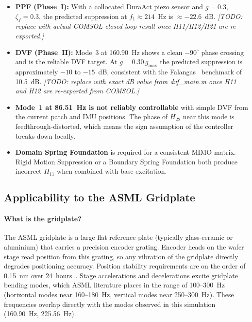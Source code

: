 \documentclass[12pt,a4paper]{article}
\begin{document}
\begin{itemize}
  \item \textbf{PPF (Phase~I):} With a collocated DuraAct piezo sensor and $g = 0.3$,
        $\zeta_f = 0.3$, the predicted suppression at $f_1 \approx 214$~Hz is
        $\approx -22.6$~dB.
        \emph{[TODO: replace with actual COMSOL closed-loop result once H11/H12/H21
        are re-exported.]}

  \item \textbf{DVF (Phase~II):} Mode~3 at 160.90~Hz shows a clean $-90^\circ$
        phase crossing and is the reliable DVF target.  At $g = 0.30\,g_\text{max}$
        the predicted suppression is approximately $-10$ to $-15$~dB, consistent
        with the Falangas~\cite{falangas1994} benchmark of 10.5~dB.
        \emph{[TODO: replace with exact dB value from dvf\_main.m once
        H11 and H12 are re-exported from COMSOL.]}

  \item \textbf{Mode~1 at 86.51~Hz is not reliably controllable} with simple DVF
        from the current patch and IMU positions.  The phase of $H_{22}$ near this
        mode is feedthrough-distorted, which means the sign assumption of the
        controller breaks down locally.

  \item \textbf{Domain Spring Foundation} is required for a consistent MIMO matrix.
        Rigid Motion Suppression or a Boundary Spring Foundation both produce
        incorrect $H_{11}$ when combined with base excitation.
\end{itemize}

\subsection{Applicability to the ASML Gridplate}
\label{sec:gridplate}

\paragraph{What is the gridplate?}
The ASML gridplate is a large flat reference plate (typically glass-ceramic or
aluminium) that carries a precision encoder grating.  Encoder heads on the wafer
stage read position from this grating, so any vibration of the gridplate directly
degrades positioning accuracy.  Position stability requirements are on the order of
0.15~nm over 24~hours~\cite{gridplate_patent}.  Stage accelerations and
decelerations excite gridplate bending modes, which ASML literature places in the
range of 100--300~Hz (horizontal modes near 160--180~Hz, vertical modes near
250--300~Hz).  These frequencies overlap directly with the modes observed in this
simulation (160.90~Hz, 225.56~Hz).
\end{document}
